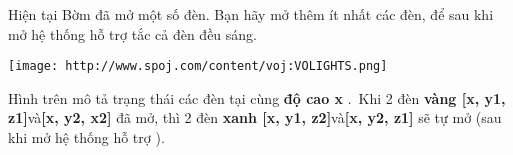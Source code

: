 Hiện tại Bờm đã mở một số đèn. Bạn hãy mở thêm ít nhất các đèn, để sau khi mở hệ thống hỗ trợ tắc cả đèn đều sáng.


\texttt{[image: http://www.spoj.com/content/voj:VOLIGHTS.png]}

Hình trên mô tả trạng thái các đèn tại cùng \textbf{độ cao x} . Khi 2 đèn \textbf{vàng [x, y1, z1]}và\textbf{[x, y2, x2]} đã mở, thì 2 đèn \textbf{xanh [x, y1, z2]}và\textbf{[x, y2, z1]} sẽ tự mở (sau khi mở hệ thống hỗ trợ ).

 